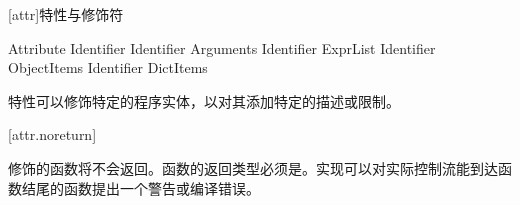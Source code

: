 
[attr]{特性与修饰符}

\begin{bnf}{Attribute}
     Identifier \br
     Identifier \terminal{(} Arguments\bnfq \terminal{)} \br
     Identifier \terminal{[} ExprList\bnfq \terminal{]} \br
     Identifier \terminal{\{} ObjectItems\bnfq \terminal{\}} \br
     Identifier \terminal{\{|} DictItems\bnfq \terminal{|\}}
\end{bnf}

\pnum
特性可以修饰特定的程序实体，以对其添加特定的描述或限制。

[attr.noreturn]{}

\pnum
{}修饰的函数将不会返回。函数的返回类型必须是。实现可以对实际控制流能到达函数结尾的函数提出一个警告或编译错误。
